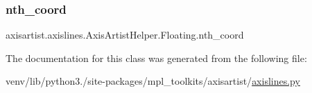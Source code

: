 \subsubsection{\texorpdfstring{nth\+\_\+coord}{nth\_coord}}
{\footnotesize\ttfamily axisartist.\+axislines.\+Axis\+Artist\+Helper.\+Floating.\+nth\+\_\+coord}



The documentation for this class was generated from the following file\+:\begin{DoxyCompactItemize}
\item 
venv/lib/python3./site-\/packages/mpl\+\_\+toolkits/axisartist/\hyperlink{axisartist_2axislines_8py}{axislines.\+py}\end{DoxyCompactItemize}
